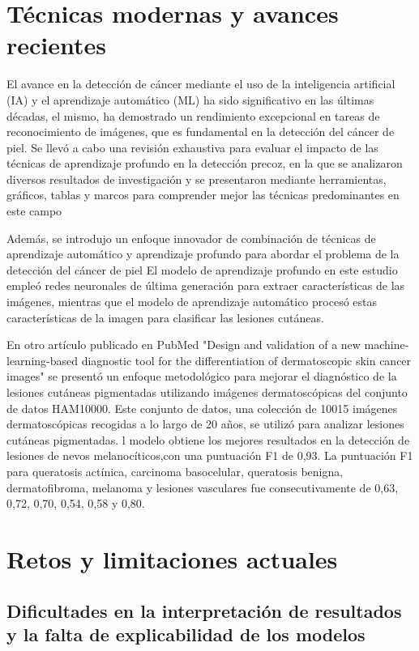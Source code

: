 \section*{Técnicas modernas y avances recientes}

El avance en la detección de cáncer mediante el uso de la inteligencia artificial (IA) y el aprendizaje automático (ML) ha sido significativo en 
las últimas décadas, el mismo, ha demostrado un rendimiento excepcional en tareas de reconocimiento de imágenes, que es fundamental en la detección 
del cáncer de piel. Se llevó a cabo una revisión exhaustiva para evaluar el impacto de las técnicas de aprendizaje profundo en la detección precoz, 
en la que se analizaron diversos resultados de investigación y se presentaron mediante herramientas, gráficos, tablas y marcos para comprender mejor 
las técnicas predominantes en este campo %


Además, se introdujo un enfoque innovador de combinación de técnicas de aprendizaje automático y aprendizaje profundo para abordar el 
problema de la detección del cáncer de piel %
 El modelo de aprendizaje profundo en este estudio empleó redes neuronales de última generación para extraer características de las imágenes, mientras que el modelo de aprendizaje automático procesó estas características de la imagen para clasificar las lesiones cutáneas.


En otro artículo publicado en PubMed "Design and validation of a new machine-learning-based diagnostic tool for the differentiation of dermatoscopic skin cancer images" \cite{tajerian2023design}
 se presentó un enfoque metodológico para mejorar el diagnóstico de la lesiones cutáneas pigmentadas utilizando imágenes dermatoscópicas del conjunto de datos HAM10000. Este conjunto de datos, una colección de 10015 imágenes dermatoscópicas recogidas a lo largo de 20 años, se utilizó para analizar lesiones cutáneas pigmentadas. l modelo obtiene los mejores resultados en la detección de lesiones de nevos melanocíticos,con una puntuación F1 de 0,93. La puntuación F1 para queratosis actínica, carcinoma basocelular, queratosis benigna, dermatofibroma, melanoma y lesiones vasculares fue consecutivamente de 0,63, 0,72, 0,70, 0,54, 0,58 y 0,80.


\section*{Retos y limitaciones actuales}

\subsection*{Dificultades en la interpretación de resultados y la falta de explicabilidad de los modelos}

